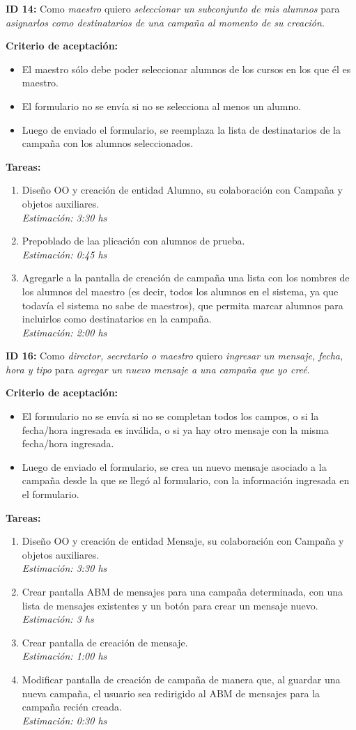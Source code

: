\documentclass[a4paper, 10pt, twoside]{article}
\newcommand{\sprintstory}[4]{
  \noindent
  \textbf{ID #1:} Como \emph{#2} quiero \emph{#3} para \emph{#4}.
}
\newenvironment{criterios}{
  \textbf{Criterio de aceptación:}
  \begin{itemize}
}{
  \end{itemize}
}
\newcommand{\criterio}[1] {
  \item #1
}
\newenvironment{tasks}{
  \textbf{Tareas:}
  \begin{enumerate}
}{
  \end{enumerate}
}
\newcommand{\task}[2] {
  \item #1.\\
  \emph{Estimación: #2 hs}
}
\begin{document}
\sprintstory{14}
            {maestro}
            {seleccionar un subconjunto de mis alumnos}
            {asignarlos como destinatarios de una campaña al momento de su creación}

\begin{criterios}
  \criterio{El maestro sólo debe poder seleccionar alumnos de los cursos en los que él es maestro.}
  \criterio{El formulario no se envía si no se selecciona al menos un alumno.}
  \criterio{Luego de enviado el formulario, se reemplaza la lista de destinatarios de la campaña con los alumnos seleccionados.}
\end{criterios}

\begin{tasks}
  \task{Diseño OO y creación de entidad Alumno, su colaboración con Campaña y objetos auxiliares}{3:30}
  \task{Prepoblado de laa plicación con alumnos de prueba}{0:45}
  \task{Agregarle a la pantalla de creación de campaña una lista con los nombres de los alumnos del maestro (es decir, todos los alumnos en el sistema, ya que todavía el sistema no sabe de maestros), que permita marcar alumnos para incluirlos como destinatarios en la campaña}{2:00}
\end{tasks}


\sprintstory{16}
            {director, secretario o maestro}
            {ingresar un mensaje, fecha, hora y tipo}
            {agregar un nuevo mensaje a una campaña que yo creé}

\begin{criterios}
  \criterio{El formulario no se envía si no se completan todos los campos, o si la fecha/hora ingresada es inválida, o si ya hay otro mensaje con la misma fecha/hora ingresada.}
  \criterio{Luego de enviado el formulario, se crea un nuevo mensaje asociado a la campaña desde la que se llegó al formulario, con la información ingresada en el formulario.}
\end{criterios}

\begin{tasks}
  \task{Diseño OO y creación de entidad Mensaje, su colaboración con Campaña y objetos auxiliares}{3:30}
  \task{Crear pantalla ABM de mensajes para una campaña determinada, con una lista de mensajes existentes y un botón para crear un mensaje nuevo}{3}
  \task{Crear pantalla de creación de mensaje}{1:00}
  \task{Modificar pantalla de creación de campaña de manera que, al guardar una nueva campaña, el usuario sea redirigido al ABM de mensajes para la campaña recién creada}{0:30}
\end{tasks}
\end{document}
